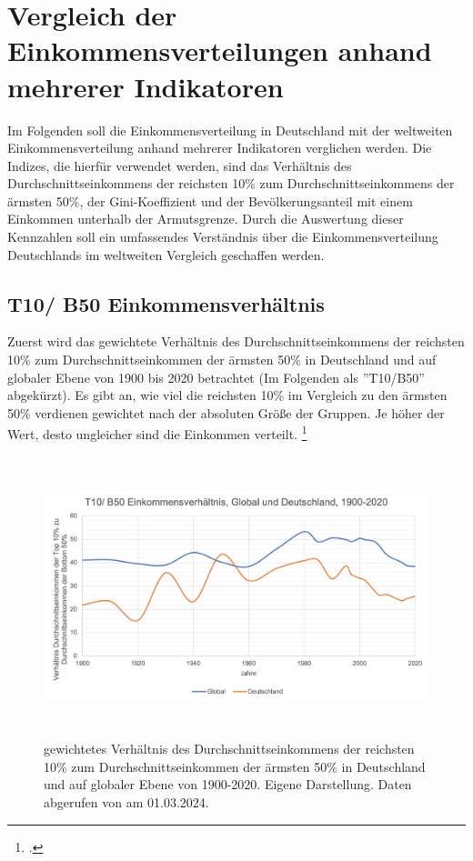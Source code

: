 \chapter{Vergleich der Einkommensverteilungen anhand mehrerer Indikatoren}

Im Folgenden soll die Einkommensverteilung in Deutschland mit der weltweiten Einkommensverteilung anhand mehrerer Indikatoren verglichen werden. Die Indizes, die hierfür verwendet werden, sind das Verhältnis des Durchschnittseinkommens der reichsten 10\% zum Durchschnittseinkommens der ärmsten 50\%, der Gini-Koeffizient und der Bevölkerungsanteil mit einem Einkommen unterhalb der Armutsgrenze. Durch die Auswertung dieser Kennzahlen soll ein umfassendes Verständnis über die Einkommensverteilung Deutschlands im weltweiten Vergleich geschaffen werden.
\section{T10/ B50 Einkommensverhältnis}

Zuerst wird das gewichtete Verhältnis des Durchschnittseinkommens der reichsten 10\% zum Durchschnittseinkommen der ärmsten 50\% in Deutschland und auf globaler Ebene von 1900 bis 2020 betrachtet (Im Folgenden als ''T10/B50'' abgekürzt). Es gibt an, wie viel die reichsten 10\% im Vergleich zu den ärmsten 50\% verdienen gewichtet nach der absoluten Größe der Gruppen. Je höher der Wert, desto ungleicher sind die Einkommen verteilt. \footcite[Vgl.][S. 31]{wir_2022}

\begin{figure}[H]
    \centering
    \includegraphics[height=8.15cm]{Bilder/T10B50-Ratio.png}
    \caption[T10/B50-Verhältnis, Deutschland und global, 1900-2020]{gewichtetes Verhältnis des Durchschnittseinkommens der reichsten 10\% zum Durchschnittseinkommen der ärmsten 50\% in Deutschland und auf globaler Ebene von 1900-2020. Eigene Darstellung. Daten abgerufen von \cite[][, S.55, 195]{wir_2022} am 01.03.2024.}
    \label{fig:iso_norm}
\end{figure}

